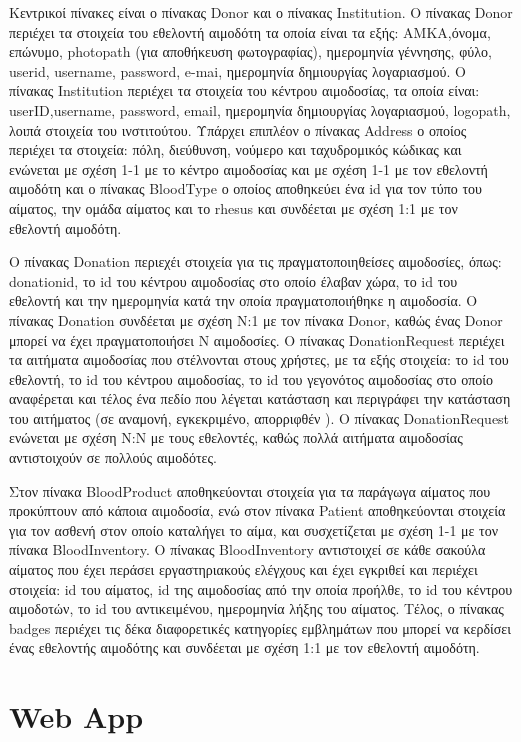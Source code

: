 		Κεντρικοί πίνακες είναι ο πίνακας Donor και ο πίνακας Institution. Ο πίνακας Donor περιέχει τα στοιχεία του εθελοντή αιμοδότη τα οποία είναι τα εξής: ΑΜΚΑ,όνομα, επώνυμο, photopath (για αποθήκευση φωτογραφίας), ημερομηνία γέννησης, φύλο, userid, username, password, e-mai, ημερομηνία δημιουργίας λογαριασμού. Ο πίνακας Institution περιέχει τα στοιχεία του κέντρου αιμοδοσίας, τα οποία είναι: userID,username, password, email, ημερομηνία δημιουργίας λογαριασμού, logopath, λοιπά στοιχεία του ινστιτούτου. Υπάρχει επιπλέον ο πίνακας Address ο οποίος περιέχει τα στοιχεία: πόλη, διεύθυνση, νούμερο και ταχυδρομικός κώδικας και ενώνεται με σχέση 1-1 με το κέντρο αιμοδοσίας και με σχέση 1-1 με τον εθελοντή αιμοδότη και ο πίνακας BloodType  ο οποίος αποθηκεύει ένα id για τον τύπο του αίματος, την ομάδα αίματος και το rhesus και συνδέεται με σχέση 1:1 με τον εθελοντή αιμοδότη.
	
		Ο πίνακας Donation περιεχέι στοιχεία για τις πραγματοποιηθείσες αιμοδοσίες, όπως: donationid, το id του κέντρου αιμοδοσίας στο οποίο έλαβαν χώρα, το id του εθελοντή και την ημερομηνία κατά την οποία πραγματοποιήθηκε η αιμοδοσία. Ο πίνακας Donation συνδέεται με σχέση N:1 με τον πίνακα Donor, καθώς ένας Donor μπορεί να έχει πραγματοποιήσει N αιμοδοσίες. Ο πίνακας DonationRequest περιέχει τα αιτήματα αιμοδοσίας που στέλνονται στους χρήστες, με τα εξής στοιχεία: το id του εθελοντή, το id του κέντρου αιμοδοσίας, το id του γεγονότος αιμοδοσίας στο οποίο αναφέρεται  και τέλος ένα πεδίο που λέγεται κατάσταση και περιγράφει την κατάσταση του αιτήματος (σε αναμονή, εγκεκριμένο, απορριφθέν ). Ο πίνακας DonationRequest ενώνεται με σχέση Ν:Ν με τους εθελοντές, καθώς πολλά αιτήματα αιμοδοσίας αντιστοιχούν σε πολλούς αιμοδότες.
	
		Στον πίνακα BloodProduct αποθηκεύονται στοιχεία για τα παράγωγα αίματος που προκύπτουν από κάποια αιμοδοσία, ενώ στον πίνακα Patient αποθηκεύονται στοιχεία για τον ασθενή στον οποίο καταλήγει το αίμα, και συσχετίζεται με σχέση 1-1 με τον πίνακα BloodInventory. Ο πίνακας BloodInventory αντιστοιχεί σε κάθε σακούλα αίματος που έχει περάσει εργαστηριακούς ελέγχους και έχει εγκριθεί και περιέχει στοιχεία: id του αίματος, id της αιμοδοσίας από την οποία προήλθε, το id του κέντρου αιμοδοτών, το id του αντικειμένου, ημερομηνία λήξης του αίματος. Τέλος, ο πίνακας badges περιέχει τις δέκα διαφορετικές κατηγορίες εμβλημάτων που μπορεί να κερδίσει ένας εθελοντής αιμοδότης και συνδέεται με σχέση 1:1 με τον εθελοντή αιμοδότη.

\section{Web App}
